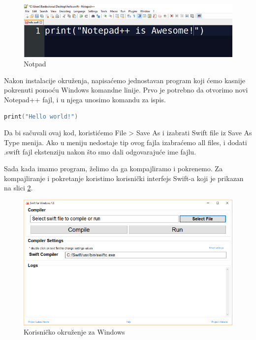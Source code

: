 \documentclass[a4paper]{article}
\begin{document}
\begin{figure}[h!]
\begin{center}
\includegraphics[scale=0.35]{notepadpp.png}
\end{center}
\caption{Notpad}
\label{fig:notpad}
\end{figure}

Nakon instalacije okruženja, napisaćemo jednostavan program koji ćemo kasnije pokrenuti pomoću Windows komandne linije. Prvo je potrebno da otvorimo novi Notepad++ fajl, i u njega unosimo komandu za ispis.

\begin{lstlisting}[language=Swift]
print("Hello world!")
\end{lstlisting}

Da bi sačuvali ovaj kod, koristićemo File > Save As i izabrati Swift file iz Save As Type menija. Ako u meniju nedostaje tip ovog fajla izabraćemo all files, i dodati .swift fajl ekstenziju nakon što smo dali odgovarajuće ime fajlu.

Sada kada imamo program, želimo da ga kompajliramo i pokrenemo. Za kompajliranje i pokretanje koristimo korisnički interfejs Swift-a koji je prikazan na slici \ref{fig:windows}.

\begin{figure}[h!]
\begin{center}
\includegraphics[scale=0.35]{swift-win.png}
\end{center}
\caption{Korisničko okruženje za Windows}
\label{fig:windows}
\end{figure}
\end{document}
